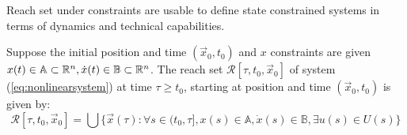 \noindent Reach set under constraints are usable to define state constrained systems in terms of dynamics and technical capabilities.
\begin{definition}
Suppose the initial position
and time $(\vec{x}_0, t_0)$ and $x$ constraints are given $x(t) \in \mathbb{A} \subset \mathbb{R}^n, \dot{x}(t) \in \mathbb{B} \subset \mathbb{R}^n$. The reach set $\mathscr{R}[\tau, t_0, \vec{x}_0]$ of system (\ref{eq:nonlinearsystem}) at time $\tau \ge t_0$, starting at position and time $(\vec{x}_0, t_0)$ is given by:
\begin{equation}
    \mathscr{R}[\tau, t_0, \vec{x}_0] = \bigcup \{\vec{x}(\tau):\forall s\in (t_0,\tau], x(s) \in \mathbb{A}, \dot{x}(s) \in \mathbb{B}, \exists u(s) \in U(s)\}
\end{equation}
\end{definition}

